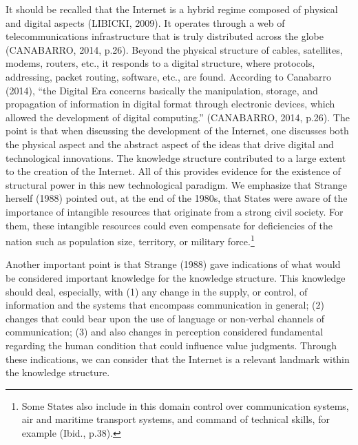 It should be recalled that the Internet is a hybrid regime composed of physical and digital aspects (LIBICKI, 2009). It operates through a web of telecommunications infrastructure that is truly distributed across the globe (CANABARRO, 2014, p.26). Beyond the physical structure of cables, satellites, modems, routers, etc., it responds to a digital structure, where protocols, addressing, packet routing, software, etc., are found. According to Canabarro (2014), ``the Digital Era concerns basically the manipulation, storage, and propagation of information in digital format through electronic devices, which allowed the development of digital computing.'' (CANABARRO, 2014, p.26). The point is that when discussing the development of the Internet, one discusses both the physical aspect and the abstract aspect of the ideas that drive digital and technological innovations. The knowledge structure contributed to a large extent to the creation of the Internet. All of this provides evidence for the existence of structural power in this new technological paradigm. We emphasize that Strange herself (1988) pointed out, at the end of the 1980s, that States were aware of the importance of intangible resources that originate from a strong civil society. For them, these intangible resources could even compensate for deficiencies of the nation such as population size, territory, or military force.\footnote{Some States also include in this domain control over communication systems, air and maritime transport systems, and command of technical skills, for example (Ibid., p.38).}

Another important point is that Strange (1988) gave indications of what would be considered important knowledge for the knowledge structure. This knowledge should deal, especially, with (1) any change in the supply, or control, of information and the systems that encompass communication in general; (2) changes that could bear upon the use of language or non-verbal channels of communication; (3) and also changes in perception considered fundamental regarding the human condition that could influence value judgments. Through these indications, we can consider that the Internet is a relevant landmark within the knowledge structure.

